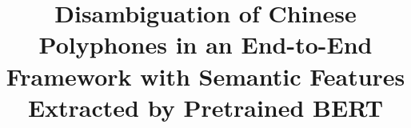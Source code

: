 \documentclass[a4paper]{article}
\title{Disambiguation of Chinese Polyphones in an End-to-End Framework with Semantic Features Extracted by Pretrained BERT}
\begin{document}
	\maketitle
	
	\

	
	
\end{document}
